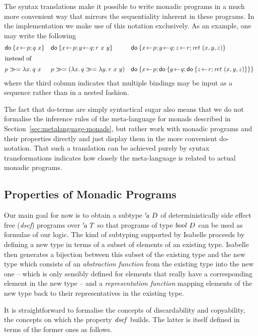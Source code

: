 The syntax translations make it possible to write monadic programs in a much
more convenient way that mirrors the sequentiality inherent in these programs.
In the implementation we make use of this notation exclusively.  As an example,
one may write the following
\begin{align*}
& \DoStmt{x\leteq p; q\ x} && \DoStmt{x\leteq p; y\leteq q; r\ x\ y} &&
  \DoStmt{x\leteq p; y\leteq q; z\leteq r; \ret~(x,y,z)}\\
\intertext{instead of }
& p \bindOp \LambdaTerm{x}{q\ x}  && 
  p \bindOp (\LambdaTerm{x}{q\bindOp \LambdaTerm{y}{r\ x\ y}}) &&
  \DoStmt{x\leteq p;\DoStmt{y\leteq q; \DoStmt{z\leteq r; \ret~(x,y,z)}}}
\end{align*}
where the third column indicates that multiple
bindings may be input as a sequence rather than in a nested fashion. 
\begin{rem}
  The fact that do-terms are simply syntactical sugar also means that we do not
  formalise the inference rules of the meta-language for monads described in
  Section~\ref{sec:metalanguage-monads}, but rather work with monadic programs
  and their properties directly and just display them in the more convenient
  do-notation. That such a translation can be achieved purely by syntax
  transformations indicates how closely the meta-language is related to actual
  monadic programs.
\end{rem}


\subsection{Properties of Monadic Programs}
\label{sec:isa-prop-monad-progr}

Our main goal for now is to obtain a subtype ${'\!\mathit{a}}\ D$ of deterministically
side effect free (\emph{dsef}) programs over ${'\!\mathit{a}}\ T$ so that programs of
type $\mathit{bool}\ D$ can be used as formulae of our logic. The kind of
subtyping supported by Isabelle proceeds by defining a new type in terms of a
subset of elements of an existing type. Isabelle then generates a bijection
between this subset of the existing type and the new type which consists of an
\emph{abstraction function} from the existing type into the new one -- which is
only sensibly defined for elements that really have a corresponding element in
the new type -- and a \emph{representation function} mapping elements of the
new type back to their representatives in the existing type. 

It is
straightforward to formalise the concepts of discardability and copyability, the
concepts on which the property $\mathit{dsef}$ builds. The latter is itself defined
in terms of the former ones as follows.

